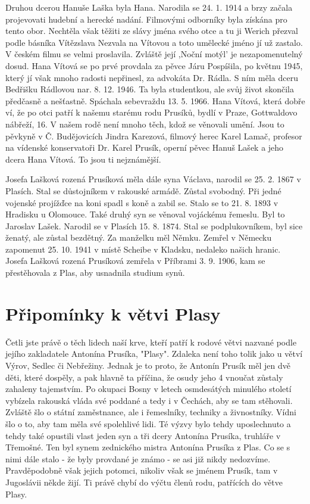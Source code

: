 \documentclass[../dejiny-rodu-prusiku.tex]{subfiles}
\begin{document}
Druhou dcerou Hanuše Laška byla Hana. Narodila se 24. 1. 1914 a brzy začala projevovati hudební a herecké nadání. Filmovými odborníky byla získána pro tento obor. Nechtěla však těžiti ze slávy jména svého otce a tu ji Werich přezval podle básníka Vítězslava Nezvala na Vítovou a toto umělecké jméno jí už zastalo. V českém filmu se velmi proslavila. Zvláště její ,Noční motýl' je nezapomenutelný dosud. Hana Vítová se po prvé provdala za pěvce Járu Pospíšila, po květnu 1945, který jí však mnoho radosti nepřinesl, za advokáta Dr. Rádla. S ním měla dceru Bedřišku Rádlovou nar. 8. 12. 1946. Ta byla studentkou, ale svůj život skončila předčasně a nešťastně. Spáchala sebevraždu 13. 5. 1966. Hana Vítová, která dobře ví, že po otci patří k našemu starému rodu Prusíků, bydlí v Praze, Gottwaldovo nábřeží, 16. V našem rodě není mnoho těch, kdož se věnovali umění. Jsou to pěvkyně v Č. Budějovicích Jindra Karezová, filmový herec Karel Lamač, profesor na vídenské konservatoři Dr. Karel Pru­sík, operní pěvec Hanuš Lašek a jeho dcera Hana Vítová. To jsou ti nejznámější.

Josefa Lašková rozená Prusíková měla dále syna Václava, narodil se 25. 2. 1867 v Plasích. Stal se důstojníkem v rakouské armádě. Zůstal svobodný. Při jedné vojenské projížďce na koni spadl s koně a zabil se. Stalo se to 21. 8. 1893 v Hradisku u Olomouce. Také druhý syn se věnoval vojáckému řemeslu. Byl to Jaroslav Lašek. Narodil se v Plasích 15. 8. 1874. Stal se podplukovníkem, byl sice ženatý, ale zůstal bez­dětný. Za manželku měl Němku. Zemřel v Německu zapomenut 25. 10. 1941 v místě Scheibe v Kladsku, nedaleko našich hranic. Josefa Lašková rozená Prusíková zemřela v Příbrami 3. 9. 1906, kam se přestěhovala z Plas, aby usnadnila studium synů.

\section{Připomínky k větvi Plasy}

Četli jste právě o těch lidech naší krve, kteří patří k rodové větvi nazvané podle jejího zakladatele Antonína Prusíka, "Plasy". Zdaleka není toho tolik jako u větví Výrov, Sedlec či Nebřežiny. Jednak je to proto, že Antonín Prusík měl jen dvě děti, které dospěly, a pak hlavně ta příčina, že osudy jeho 4 vnoučat zůstaly zahaleny tajemstvím. Po okupaci Bosny v letech osmdesátých minulého století vybízela rakouská vláda své poddané a tedy i v Čechách, aby se tam stěhovali. Zvláště šlo o státní zaměstnance, ale i řemeslníky, techniky a živnostníky. Vídni šlo o to, aby tam měla své spolehlivé lidi. Té výzvy bylo tehdy uposlechnuto a tehdy také opustili vlast jeden syn a tři dcery Antonína Prusíka, truhláře v Třemošné. Ten byl synem zednického mistra Antonína Prusíka z Plas. Co se s nimi dále stalo - že byly provdané je známo - se asi již nikdy nedozvíme. Pravděpodobně však jejich potomci, nikoliv však se jménem Prusík, tam v Jugoslá­vii někde žijí. Ti právě chybí do výčtu členů rodu, patřících do větve Plasy.
\end{document}
